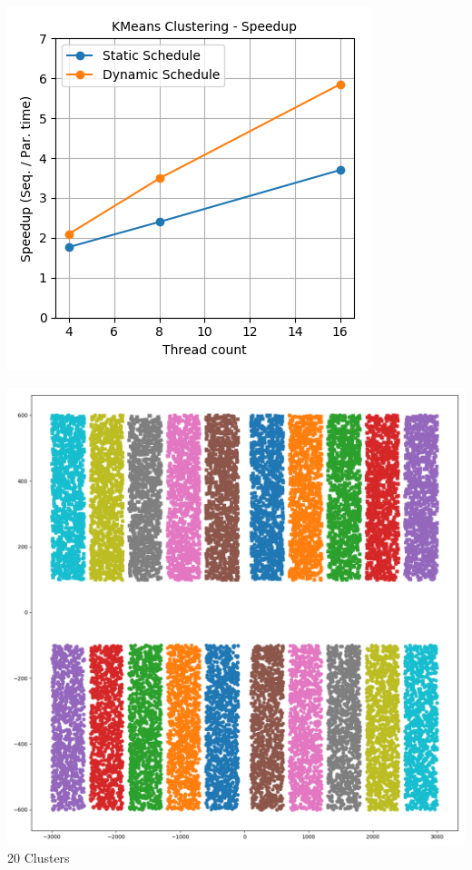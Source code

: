 \documentclass[11pt,a4paper,oneside]{article}
\begin{document}
	\begin{center}
		\includegraphics[scale=0.7]{1.png}		
	\end{center}

    \begin{center}
    	\includegraphics[scale=0.2]{2.png}	\\
    	20 Clusters	
    \end{center}
	 
\end{document}
